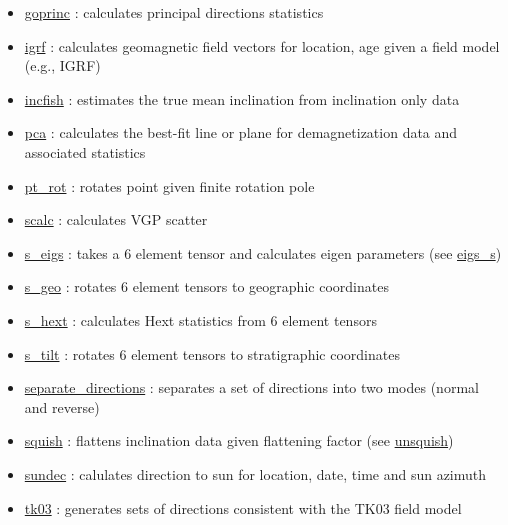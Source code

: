 \documentclass[11pt]{book}
\begin{document}
{{\begin{itemize}
\item \href{https://pmagpy.github.io/PmagPy_calculations.html#goprinc}{goprinc} : calculates principal directions statistics
\item \href{https://pmagpy.github.io/PmagPy_calculations.html#igrf}{igrf} : calculates geomagnetic field vectors for location, age given a field model (e.g., IGRF)
\item \href{https://pmagpy.github.io/PmagPy_calculations.html#incfish}{incfish} : estimates the true mean inclination from inclination only data
\item \href{https://pmagpy.github.io/PmagPy_calculations.html#pca}{pca} : calculates the best-fit line or plane for demagnetization data and associated statistics
\item \href{https://pmagpy.github.io/PmagPy_calculations.html#pt_rot}{pt\_rot} : rotates point given finite rotation pole
\item \href{https://pmagpy.github.io/PmagPy_calculations.html#scalc}{scalc} : calculates  VGP scatter
\item \href{https://pmagpy.github.io/PmagPy_calculations.html#s_eigs}{s\_eigs} : takes a 6 element tensor and calculates eigen parameters (see \href{https://pmagpy.github.io/PmagPy_calculations.html#eigs_s}{eigs\_s})
\item \href{https://pmagpy.github.io/PmagPy_calculations.html#s_geo}{s\_geo} : rotates 6 element tensors to geographic coordinates
\item \href{https://pmagpy.github.io/PmagPy_calculations.html#s_hext}{s\_hext} : calculates Hext statistics from 6 element tensors
\item \href{https://pmagpy.github.io/PmagPy_calculations.html#s_tilt}{s\_tilt} : rotates 6 element tensors to stratigraphic coordinates
\item \href{https://pmagpy.github.io/PmagPy_calculations.html#separate_directions}{separate\_directions} : separates a set of directions into two modes (normal and reverse)
\item \href{https://pmagpy.github.io/PmagPy_calculations.html#squish}{squish} : flattens inclination data given flattening factor (see \href{https://pmagpy.github.io/PmagPy_calculations.html#unsquish}{unsquish})
\item \href{https://pmagpy.github.io/PmagPy_calculations.html#sundec}{sundec} : calulates direction to sun for location, date, time and sun azimuth
\item \href{https://pmagpy.github.io/PmagPy_calculations.html#tk03}{tk03} : generates sets of directions consistent with the TK03 field model

\end{itemize}}}
\end{document}
